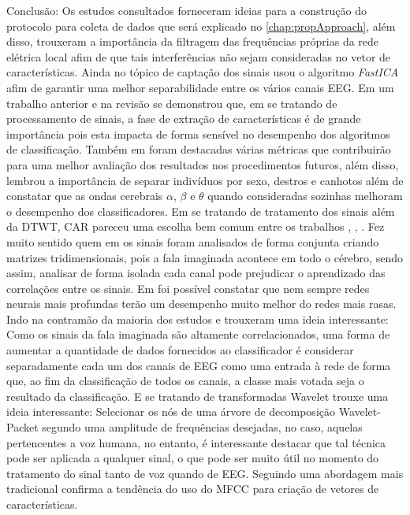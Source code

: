			\par Conclusão: Os estudos consultados forneceram ideias para a construção do protocolo para coleta de dados que será explicado no \autoref{chap:propApproach}, além disso, trouxeram a importância da filtragem das frequências próprias da rede elétrica local \cite{MahapatraNrushinghCharan2023Ecoi} afim de que tais interferências não sejam consideradas no vetor de características. Ainda no tópico de captação dos sinais \cite{MahapatraNrushinghCharan2022MCoI} usou o algoritmo \textit{FastICA} afim de garantir uma melhor separabilidade entre os vários canais EEG. Em um trabalho anterior \cite{furlan2021caracterizacao} e na revisão \cite{ShahUzair2022TRoA} se demonstrou que, em se tratando de processamento de sinais, a fase de extração de características é de grande importância pois esta impacta de forma sensível no desempenho dos algoritmos de classificação. Também em \cite{ShahUzair2022TRoA} foram destacadas várias métricas que contribuirão para uma melhor avaliação dos resultados nos procedimentos futuros, além disso, \cite{AgarwalPrabhakar2022Ebia} lembrou a importância de separar indivíduos por sexo, destros e canhotos além de constatar que as ondas cerebrais $\alpha$, $\beta$ e $\theta$ quando consideradas sozinhas melhoram o desempenho dos classificadores. Em se tratando de tratamento dos sinais além da DTWT, CAR pareceu uma escolha bem comum entre os trabalhos \cite{AgarwalPrabhakar2022Ebia}, \cite{Hernandez-Del-ToroTonatiuh2021TaEB}, \cite{MOCTEZUMA2019201}. Fez muito sentido quem em \cite{PanachakelJerrinRamakrishnan} os sinais foram analisados de forma conjunta criando matrizes tridimensionais, pois a fala imaginada acontece em todo o cérebro, sendo assim, analisar de forma isolada cada canal pode prejudicar o aprendizado das correlações entre os sinais. Em \cite{tamm2020classification} foi possível constatar que nem sempre redes neurais mais profundas terão um desempenho muito melhor do redes mais rasas. Indo na contramão da maioria dos estudos \cite{Panachakel_2019} e \cite{panachakel2020novel} trouxeram uma ideia interessante: Como os sinais da fala imaginada são altamente correlacionados, uma forma de aumentar a quantidade de dados fornecidos ao classificador é considerar separadamente cada um dos canais de EEG como uma entrada à rede de forma que, ao fim da classificação de todos os canais, a classe mais votada seja o resultado da classificação. E se tratando de transformadas Wavelet \cite{math11194205} trouxe uma ideia interessante: Selecionar os nós de uma árvore de decomposição Wavelet-Packet segundo uma amplitude de frequências desejadas, no caso, aquelas pertencentes a voz humana, no entanto, é interessante destacar que tal técnica pode ser aplicada a qualquer sinal, o que pode ser muito útil no momento do tratamento do sinal tanto de voz quando de EEG. Seguindo uma abordagem mais tradicional \cite{ali2022speech} confirma a tendência do uso do MFCC para criação de vetores de características.
			